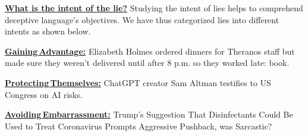 
\vspace{-2mm}
\noindent
\textbf{\ul{What is the intent of the lie?}}
Studying the intent of lies helps to comprehend deceptive language's objectives. We have thus categorized lies into different intents as shown below. 


\vspace{-3mm}
\begin{tcolorbox}[enhanced,attach boxed title to top right={yshift=-3mm,yshifttext=-1mm},
  colback=blue!5!white,colframe=blue!75!black,colbacktitle=red!80!black,
  title=$3^{rd}$ level: intent of lie,fonttitle=\bfseries,
  boxed title style={size=small,colframe=red!50!black},left=0pt, right=0pt ]
  
\begin{spacing}{0.8}
\textbf{\ul{\footnotesize Gaining\,Advantage:} }{\fontsize{8}{10}\selectfont
  Elizabeth Holmes ordered dinners for Theranos staff but made sure they weren't delivered until after 8 p.m. so they worked late: book.
  }
\end{spacing}  

  \vspace{-2.5mm}
  \DrawLine

  \begin{spacing}{0.8}
  \textbf{\ul{\footnotesize Protecting\,Themselves:} }{\fontsize{8}{10}\selectfont
ChatGPT creator Sam Altman testifies to US Congress on AI risks.}
  \end{spacing} 

  \vspace{-2.5mm}
  \DrawLine

  \begin{spacing}{0.8}
  \textbf{\ul{\footnotesize Avoiding\,Embarrassment:} }{\fontsize{8}{10}\selectfont 
Trump’s Suggestion That Disinfectants Could Be Used to Treat Coronavirus Prompts Aggressive Pushback, was Sarcastic?}
  \end{spacing} 

  \vspace{-2.5mm}
  \DrawLine


\end{tcolorbox}

